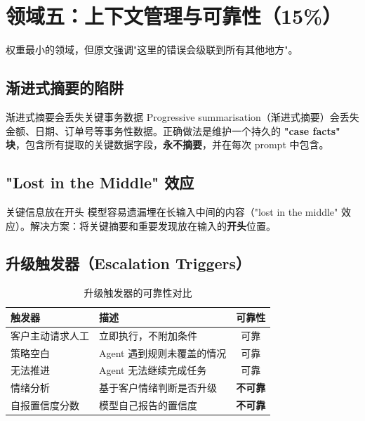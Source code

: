 \section{领域五：上下文管理与可靠性（15\%）}

权重最小的领域，但原文强调"这里的错误会级联到所有其他地方"。

\subsection{渐进式摘要的陷阱}

\begin{warningbox}{渐进式摘要会丢失关键事务数据}
Progressive summarisation（渐进式摘要）会丢失金额、日期、订单号等事务性数据。正确做法是维护一个持久的 \textbf{"case facts" 块}，包含所有提取的关键数据字段，\textbf{永不摘要}，并在每次 prompt 中包含。
\end{warningbox}

\subsection{"Lost in the Middle" 效应}

\begin{importantbox}{关键信息放在开头}
模型容易遗漏埋在长输入中间的内容（"lost in the middle" 效应）。解决方案：将关键摘要和重要发现放在输入的\textbf{开头}位置。
\end{importantbox}

\subsection{升级触发器（Escalation Triggers）}

\begin{table}[H]
\centering
\begin{tabular}{lp{7cm}c}
\toprule
\textbf{触发器} & \textbf{描述} & \textbf{可靠性} \\
\midrule
客户主动请求人工 & 立即执行，不附加条件 & 可靠 \\
策略空白 & Agent 遇到规则未覆盖的情况 & 可靠 \\
无法推进 & Agent 无法继续完成任务 & 可靠 \\
\midrule
情绪分析 & 基于客户情绪判断是否升级 & \textbf{不可靠} \\
自报置信度分数 & 模型自己报告的置信度 & \textbf{不可靠} \\
\bottomrule
\end{tabular}
\caption{升级触发器的可靠性对比}
\end{table}


